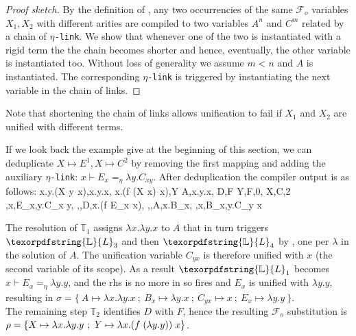 \documentclass[sigconf,natbib=false,review]{acmart}
\newcommand{\appsep}{\ensuremath{\textcolor{lightgray}{\cdot}}}
\newcommand{\linkMacro}[1]{\ensuremath{#1}\texttt{-link}\xspace}
\newcommand{\linketa} {\linkMacro{\eta}}
\newcommand{\Fo}{\texorpdfstring{\ensuremath{\mathcal{F}_{\!o}\xspace}}{Fo}} %
\newcommand{\linketaM}[3]{\ensuremath{#1 \vdash #2 =_\eta #3}}
\newcommand{\mapping}[3]{\ensuremath{#1 \mapsto #2^#3}}
\newcommand{\rhs}{rhs\xspace}
\newcommand{\linkStore}{\texorpdfstring{\ensuremath{\mathbb{L}}\xspace}{L}}
\newcommand{\hoUnifPb}{\ensuremath{\mathbb{T}}\xspace}
\begin{document}
\begin{proof}[Proof sketch]
  By the definition of \mapdeduplication, any two occurrencies of the same \Fo{} 
  variables $X_1, X_2$ with different arities are compiled to two
  variables $A^n$ and $C^m$ related by a chain of \linketa.
  We show that whenever one of the two is instantiated with a rigid term the 
  the chain becomes shorter and hence, eventually, the
  other variable is instantiated too.
  Without loss of generality we assume $m < n$ and $A$ is instantiated.
  The corresponding \linketa is triggered by \progressetaleft instantiating
  the next variable in the chain of links.
\end{proof}

\noindent
Note that shortening the chain of links allows unification to fail if
$X_1$ and $X_2$ are unified with different terms.

If we look back the example give at the beginning of this section, we can
deduplicate $\mapping{X}{E}{1}, \mapping{X}{C}{2}$ by removing the first mapping
and adding the auxiliary \linketa: \linketaM{x}{E_{x}}{\lambda y.C_{x y}}.
After deduplication the compiler output is as follows:
\printAlll
  {{{\lambda x.\lambda y.(X\appsep y\appsep x),\lambda x.\lambda y.x},
    {\lambda x.(f\appsep (X\appsep x)\appsep x),Y}}}
  {{{A,\lambda x.\lambda y.x},
    {D,F}}}
  {{{Y,F,0},
    {X,C,2}}}
  {{{\eta,x,E_{x},\lambda y.C_{x y}},
    {\eta,,D,\lambda x.(f\appsep E_{x}\appsep x)},
    {\eta,,A,\lambda x.B_{x}},
    {\eta,x,B_{x},\lambda y.C_{y x}}}}

\noindent
The resolution of $\hoUnifPb_1$ assigns $\lambda x.\lambda y.x$ to $A$
that in turn triggers $\linkStore_3$ and then $\linkStore_4$ by \progressetaleft,
one per $\lambda$ in the solution of $A$.
The unification variable $C_{yx}$ is therefore unified with $x$
(the second variable of its scope).
As a result $\linkStore_1$ becomes \linketaM{x}{E_x}{\lambda y.y},
and the \rhs is no more in \maybeeta so \progressetaright fires and
$E_x$ is unified with $\lambda y.y$, resulting in
$\sigma = \{~ A \mapsto \lambda x.\lambda y.x ~;~ B_x \mapsto \lambda y.x ~;~ C_{yx} \mapsto x ~;~ E_x \mapsto \lambda y.y~\}$.\\
The remaining step $\hoUnifPb_2$ identifies $D$ with $F$,
hence the resulting \Fo{} substitution is
$\rho = \{X \mapsto \lambda x.\lambda y.y ~;~ Y \mapsto \lambda x.(f\appsep (\lambda y.y))\appsep x\}$.
\end{document}
